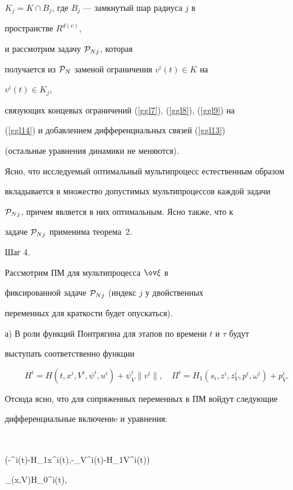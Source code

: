 $K_j=K\cap B_j$, где $B_j$ --- замкнутый шар радиуса $j$ в


пространстве $R^{d(v)}$,


и рассмотрим задачу ${\cal P}_{Nj}$, которая


получается из ${\cal P}_{N}$ заменой ограничения $v^i(t)\in K$ на


$v^i(t)\in K_j$,


связующих концевых ограничений (\ref{ggl7}), (\ref{ggl8}), (\ref{ggl9}) на


(\ref{ggl14}) и добавлением дифференциальных связей (\ref{ggl13})


(остальные уравнения динамики не меняются).





Ясно, что исследуемый оптимальный мультипроцесс естественным образом


вкладывается в множество допустимых мультипроцессов каждой задачи


${\cal P}_{Nj}$, причем является в них оптимальным. Ясно также, что к


задаче ${\cal P}_{Nj}$ применима теорема~2.


\medskip





Шаг 4. 


Рассмотрим ПМ для мультипроцесса $\ov\xi$ в


фиксированной задаче ${\cal P}_{Nj}$ (индекс $j$ у двойственных


переменных для краткости будет опускаться).


\smallskip





а) В роли функций Понтрягина для этапов по времени $t$ и $\tau$ будут


выступать соответственно функции


$$


H^i=H(t,x^i,V^i,\psi^i,u^i)+\psi_V^i\|v^i\|,\quad


\Pi^i=H_1(s_i,z^i,z_V^i,p^i,\omega^i)+p_V^i.$$


Отсюда ясно, что для сопряженных переменных в ПМ войдут следующие


дифференциальные включениe и уравнения:


$$


(-\Dot{\psi}^i(t)-H_{1x}^i(t),-\Dot{\psi}_V^i(t)-H_{1V}^i(t))\in


\partial_{(x,V)}H_0^i(t), \quad


